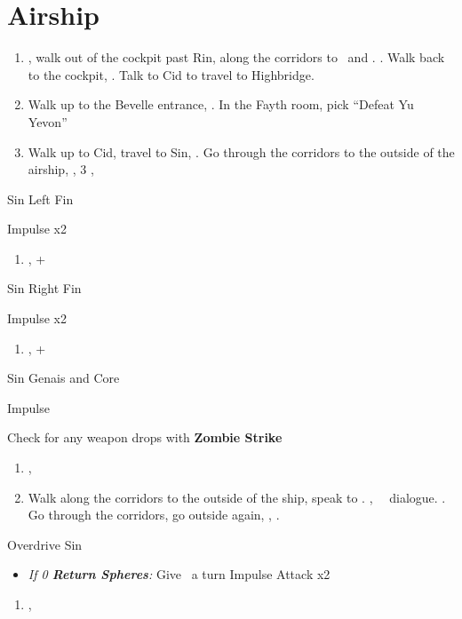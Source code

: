 \chapter{Airship}
\begin{enumerate}
	\item \sd, walk out of the cockpit past Rin, along the corridors to \yuna\ and \kimahri. \sd. Walk back to the cockpit, \sd. Talk to Cid to travel to Highbridge.
	\item Walk up to the Bevelle entrance, \sd. In the Fayth room, pick ``Defeat Yu Yevon''
	\item Walk up to Cid, travel to Sin, \sd. Go through the corridors to the outside of the airship, \sd, 3 \skippablefmv[2:10], \sd
\end{enumerate}
\begin{battle}[65000]{Sin Left Fin}
\begin{itemize}
	\summon{\bahamut}
	\bahamutf Impulse x2
\end{itemize}
\end{battle}
\begin{enumerate}[resume]
	\item \sd, \cs+\skippablefmv
\end{enumerate}
\begin{battle}[65000]{Sin Right Fin}
\begin{itemize}
	\summon{\bahamut}
	\bahamutf Impulse x2
\end{itemize}
\end{battle}
\begin{enumerate}[resume]
	\item \sd, \cs+\skippablefmv
\end{enumerate}
\begin{battle}[56000]{Sin Genais and Core}
\begin{itemize}
	\summon{\bahamut}
	\bahamutf Impulse
\end{itemize}
Check for any weapon drops with \textbf{Zombie Strike}
\end{battle}
\begin{enumerate}[resume]
	\item \sd, \skippablefmv
	\item Walk along the corridors to the outside of the ship, speak to \yuna. \cs[1:40], \sd\ \rikku\ dialogue. \skippablefmv. Go through the corridors, go outside again, \skippablefmv, \sd.
\end{enumerate}
\begin{battle}[140000]{Overdrive Sin}
\begin{itemize}
	\item \textit{If 0 \textbf{Return Spheres}:} Give \tidus\ a turn
	\summon{\bahamut}
	\bahamutf Impulse
	\bahamutf Attack x2
\end{itemize}
\end{battle}
\begin{enumerate}[resume]
	\item \skippablefmv[1:20], \sd
\end{enumerate}